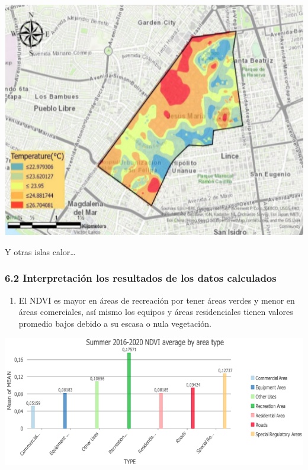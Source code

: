 \documentclass[
]{article}
\providecommand{\tightlist}{%
  \setlength{\itemsep}{0pt}\setlength{\parskip}{0pt}}
\begin{document}
\begin{center}\includegraphics{Img/Islas} \end{center}

Y otras islas calor\ldots{}

\hypertarget{interpretaciuxf3n-los-resultados-de-los-datos-calculados}{%
\subsubsection{6.2 Interpretación los resultados de los datos
calculados}\label{interpretaciuxf3n-los-resultados-de-los-datos-calculados}}

\begin{enumerate}
\def\labelenumi{\alph{enumi})}
\tightlist
\item
  El NDVI es mayor en áreas de recreación por tener áreas verdes y menor
  en áreas comerciales, así mismo los equipos y áreas residenciales
  tienen valores promedio bajos debido a su escasa o nula vegetación.
\end{enumerate}

\begin{center}\includegraphics{Img/interpretacionislas} \end{center}
\end{document}
